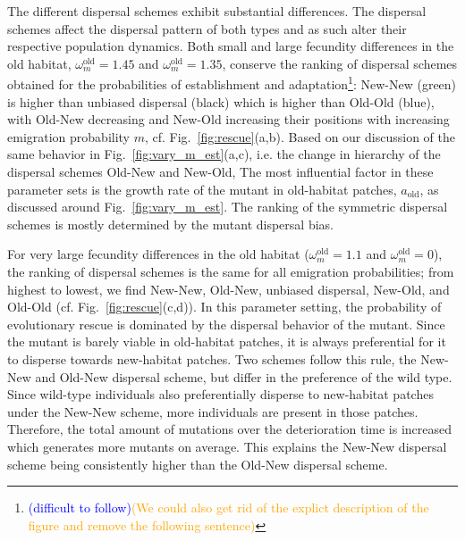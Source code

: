 \documentclass[a4paper,11pt]{article}
\newcommand{\francois}[1]{\textcolor{blue}{(#1)}}
\newcommand{\pete}[1]{\textcolor{orange}{(#1)}}
\newcommand{\chg}[1]{\textcolor{change}{#1}}
\begin{document}
The different dispersal schemes exhibit substantial differences. The dispersal schemes affect the dispersal pattern of both types and as such alter their respective population dynamics. Both small and large fecundity differences in the old habitat, $\omega^\text{old}_m=1.45$ and $\omega^\text{old}_m=1.35$, conserve the ranking of dispersal schemes obtained for the probabilities of establishment and adaptation\footnote{\francois{difficult to follow}\pete{We could also get rid of the explict description of the figure and remove the following sentence}}: \chg{New-New (green) is higher than unbiased dispersal (black) which is higher than Old-Old (blue), with Old-New decreasing and New-Old increasing their positions with increasing emigration probability $m$}, cf. Fig.~\ref{fig:rescue}(a,b). Based on our discussion of the same behavior in Fig.~\ref{fig:vary_m_est}(a,c), \chg{i.e. the change in hierarchy of the dispersal schemes Old-New and New-Old,} The most influential factor in these parameter sets is the growth rate of the mutant in old-habitat patches, $a_{\text{old}}$, \chg{as discussed around Fig.~\ref{fig:vary_m_est}.} \chg{The ranking of the symmetric dispersal schemes is mostly determined by the mutant dispersal bias.}

For very large fecundity differences in the old habitat ($\omega^\text{old}_m = 1.1$ and $\omega^\text{old}_m=0$), the ranking of dispersal schemes is the same for all emigration probabilities; from highest to lowest, we find \chg{New-New, Old-New, unbiased dispersal, New-Old, and Old-Old} (cf. Fig.~\ref{fig:rescue}(c,d)). In this parameter setting, the probability of evolutionary rescue is dominated by the dispersal behavior of the mutant. Since the mutant is barely viable in old-habitat patches, it is always preferential for it to disperse towards new-habitat patches. Two schemes follow this rule, \chg{the New-New and Old-New dispersal scheme}, but differ in the preference of the wild type. 
Since wild-type individuals also preferentially disperse to new-habitat patches under \chg{the New-New scheme}, more individuals are present in those patches. Therefore, the total amount of mutations over the deterioration time is increased which generates more mutants on average. This explains the New-New dispersal scheme being consistently higher than the Old-New dispersal scheme.
\end{document}

